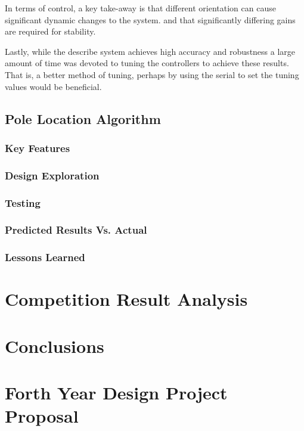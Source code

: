 \documentclass[ece]{uw-wkrpt}
\let\oldsection\section
\renewcommand\section{\clearpage\oldsection}
\begin{document}
In terms of control, a key take-away is that different orientation can cause significant dynamic changes to the system. and that significantly differing gains are required for stability. 

Lastly, while the describe system achieves high accuracy and robustness a large amount of time was devoted to tuning the controllers to achieve these results. That is, a better method of tuning, perhaps by using the serial to set the tuning values would be beneficial. 
% 
\subsection{Pole Location Algorithm}
\subsubsection{Key Features}
\subsubsection{Design Exploration}
\subsubsection{Testing}
\subsubsection{Predicted Results Vs. Actual}
\subsubsection{Lessons Learned}
% 
\section{Competition Result Analysis}
% 
\section{Conclusions}

\section{Forth Year Design Project Proposal}

\begingroup
\raggedright
\sloppy

\endgroup

\appendix
\end{document}
